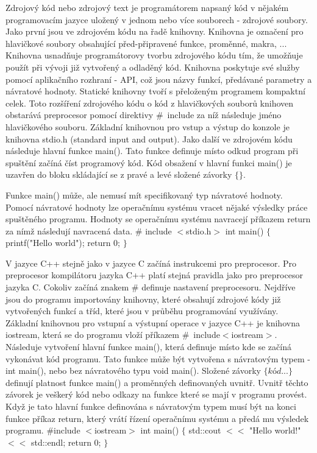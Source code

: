 
\def\odsadit{\hskip 5mm}

Zdrojový kód nebo zdrojový text je programátorem napsaný kód v nějakém programovacím jazyce uložený v jednom nebo více souborech - zdrojové soubory. 
Jako první jsou ve zdrojovém kódu na řadě knihovny. Knihovna je označení pro hlavičkové soubory obsahující  před-připravené funkce, proměnné, makra, ... Knihovna usnadňuje programátorovy tvorbu zdrojového kódu tím, že umožňuje použít při vývoji již vytvořený a odladěný kód. Knihovna poskytuje své služby pomocí aplikačního rozhraní - API, což jsou názvy funkcí, předávané parametry a návratové hodnoty. Statické knihovny tvoří s přeloženým programem kompaktní celek. Toto rozšíření zdrojového kódu o kód z hlavičkových souborů knihoven obstarává preprocesor pomocí direktivy \#~include za níž následuje jméno hlavičkového souboru. Základní knihovnou pro vstup a výstup do konzole je knihovna stdio.h (standard input and output).
Jako další ve zdrojovém kódu následuje hlavní funkce main(). Tato funkce definuje místo odkud program při spuštění začíná číst programový kód. Kód obsažení v hlavní funkci main() je uzavřen do bloku skládající se z pravé a levé složené závorky $\{\}$.\par
Funkce main() může, ale nemusí mít specifikovaný typ návratové hodnoty. Pomocí návratové hodnoty lze operačnímu systému vracet nějaké výsledky práce spuštěného programu. Hodnoty se operačnímu systému navracejí příkazem return za nímž následují navracená data.
{
\verbatim
\odradkovat
\# include $<$stdio.h$>$
\odradkovat
int main()
\odradkovat
$\{$
\odradkovat
\odsadit printf("Hello world");
\odradkovat
\odsadit return 0;
\odradkovat
$\}$
}


V jazyce C++ stejně jako v jazyce C začíná instrukcemi pro preprocesor. Pro preprocesor kompilátoru jazyka C++ platí stejná pravidla jako pro preprocesor jazyka C. Cokoliv začíná znakem \# definuje nastavení preprocesoru. 
Nejdříve jsou do programu importovány knihovny, které obsahují zdrojové kódy již vytvořených funkcí a tříd, které jsou v průběhu programování využívány. Základní knihovnou pro vstupní a výstupní operace v jazyce C++ je knihovna iostream, která se do programu vloží příkazem \#~include$<$iostream$>$. 
Následuje vytvoření hlavní funkce main(), která definuje místo kde se začíná vykonávat kód programu. Tato funkce může být vytvořena s návratovým typem - int main(), nebo bez návratového typu void main(). Složené závorky $\{kód...\}$ definují platnost funkce main() a proměnných definovaných uvnitř. Uvnitř těchto závorek je veškerý kód nebo odkazy na funkce které se mají v programu provést. Když je tato hlavní funkce definována s návratovým typem musí být na konci funkce příkaz return, který vrátí řízení operačnímu systému a předá mu výsledek programu.
{
\verbatim
\odradkovat
\#include $<$iostream$>$
\odradkovat
int main()
\odradkovat
$\{$
\odradkovat
\odsadit std::cout $<<$ "Hello world!" $<<$ std::endl; 
\odradkovat
\odsadit return 0;
\odradkovat
$\}$
}

